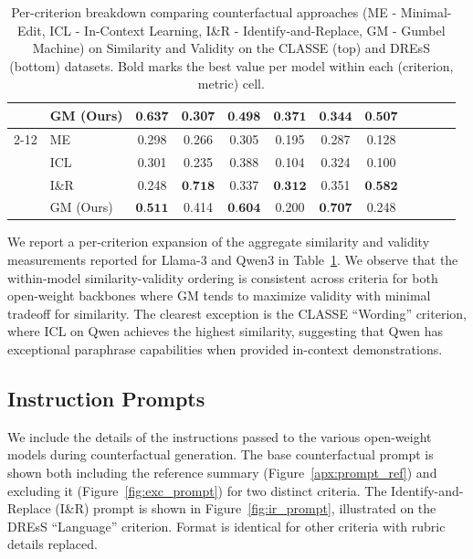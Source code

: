 \documentclass[letterpaper]{article} %
\begin{document}
\begin{table}[!htbp]
{\begin{tabular}{ll  cc  cc  cc  cc  cc}
  & GM (Ours) & $\textbf{0.637}$ & 0.307 & $\textbf{0.498}$ & $\textbf{0.371}$ & $\textbf{0.344}$ & $\textbf{0.507}$ & & & & \\
\cmidrule(l){2-12}
\multirow{4}{*}{Qwen}
  & ME       & 0.298 & 0.266 & 0.305 & 0.195 & 0.287 & 0.128 & & & & \\
  & ICL      & 0.301 & 0.235 & 0.388 & 0.104 & 0.324 & 0.100 & & & & \\
  & I\&R     & 0.248 & $\textbf{0.718}$ & 0.337 & $\textbf{0.312}$ & 0.351 & $\textbf{0.582}$ & & & & \\
  & GM (Ours) & $\textbf{0.511}$ & 0.414 & $\textbf{0.604}$ & 0.200 & $\textbf{0.707}$ & 0.248 & & & & \\
\bottomrule
\end{tabular}}
\caption{Per-criterion breakdown comparing counterfactual approaches (ME - Minimal-Edit, ICL - In-Context Learning, I\&R - Identify-and-Replace, GM - Gumbel Machine) on Similarity and Validity on the CLASSE (top) and DREsS (bottom) datasets. Bold marks the best value per model within each (criterion, metric) cell. }
\label{tab:appendix_per_criterion}
\end{table}
We report a per-criterion expansion of the aggregate similarity and validity measurements reported for Llama-3 and Qwen3 in 
Table~\ref{tab:appendix_per_criterion}. We observe that the within-model similarity-validity ordering is consistent across criteria for both open-weight backbones where GM tends to maximize validity with minimal tradeoff for similarity. The clearest exception is the CLASSE ``Wording'' criterion, where ICL on Qwen achieves the highest similarity, suggesting that Qwen has exceptional paraphrase capabilities when provided in-context demonstrations.

\subsection{Instruction Prompts} \label{apx:prompts}

We include the details of the instructions passed to the various open-weight models during counterfactual generation. The base counterfactual prompt is shown both including the reference summary (Figure~\ref{apx:prompt_ref}) and excluding it (Figure~\ref{fig:exc_prompt}) for two distinct criteria. The Identify-and-Replace (I\&R) prompt is shown in Figure~\ref{fig:ir_prompt}, illustrated on the DREsS ``Language'' criterion. Format is identical for other criteria with rubric details replaced.
\end{document}
